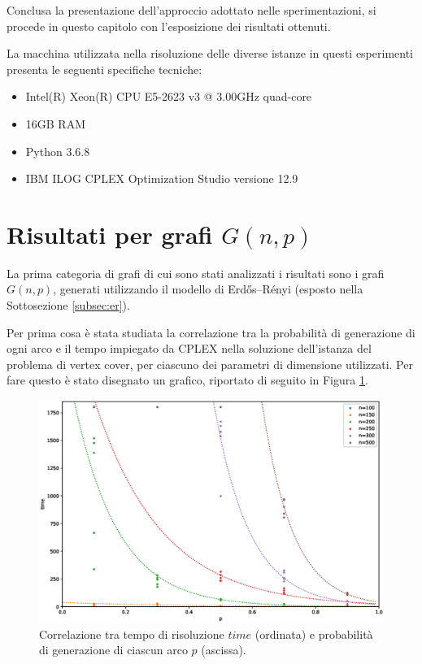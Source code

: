 Conclusa la presentazione dell'approccio adottato nelle sperimentazioni, si procede in questo capitolo con l'esposizione dei risultati ottenuti. 

La macchina utilizzata nella risoluzione delle diverse istanze in questi esperimenti presenta le seguenti specifiche tecniche:
\begin{itemize}
\item Intel(R) Xeon(R) CPU E5-2623 v3 @ 3.00GHz quad-core
\item 16GB RAM
\item Python 3.6.8
\item IBM ILOG CPLEX Optimization Studio versione 12.9
\end{itemize}


\newpage
\section{Risultati per grafi $G(n,p)$}
La prima categoria di grafi di cui sono stati analizzati i risultati sono i grafi $G(n,p)$, generati utilizzando il modello di Erdős–Rényi (esposto nella Sottosezione \ref{subsec:er}).

Per prima cosa è stata studiata la correlazione tra la probabilità di generazione di ogni arco e il tempo impiegato da CPLEX nella soluzione dell'istanza del problema di vertex cover, per ciascuno dei parametri di dimensione utilizzati. Per fare questo è stato disegnato un grafico, riportato di seguito in Figura \ref{fig:gnp2d}.
\vspace{-0.5cm}
\begin{figure}[h!]
     \centering
       \includegraphics[scale=0.4]{images/gnp-2d.eps}
       \caption{Correlazione tra tempo di risoluzione $time$ (ordinata) e probabilità di generazione di ciascun arco $p$ (ascissa).}
        \label{fig:gnp2d}
\end{figure}

